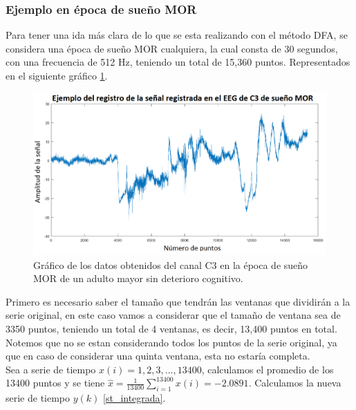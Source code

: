 \documentclass[letterpaper,titlepage,12pt]{report}
\begin{document}
\sloppy %

\subsubsection{Ejemplo en \'epoca de sue\~no MOR}

Para tener una ida m\'as clara de lo que se esta realizando con el m\'etodo DFA, se considera una \'epoca de sue\~no MOR cualquiera, la cual consta de 30 segundos, con una frecuencia de 512 Hz, teniendo un total de 15,360 puntos. Representados en el siguiente gr\'afico \ref{ejemplo}.  

\begin{figure}[H]
\begin{center}
\includegraphics[scale=0.3]{Ejemplo.png}
\caption{Gr\'afico de los datos obtenidos del canal C3 en la \'epoca de sue\~no MOR de un adulto mayor sin deterioro cognitivo.}
\label{ejemplo}
\end{center}
\end{figure}

Primero es necesario saber el tama\~no que tendr\'an las ventanas que dividir\'an a la serie original, en este caso vamos a considerar que el tama\~no de ventana sea de 3350 puntos, teniendo un total de 4 ventanas, es decir, 13,400 puntos en total. Notemos que no se estan considerando todos los puntos de la serie original, ya que en caso de considerar una quinta ventana, esta no estar\'ia completa.\\

Sea a serie de tiempo $x(i)=1,2,3,...,13400$, calculamos el promedio de los 13400 puntos y se tiene $\displaystyle \hat{x}=\frac{1}{13400} \sum_{i=1}^{13400} x(i)=-2.0891$. Calculamos la nueva serie de tiempo $y(k)$ \eqref{st_integrada}.\\
\end{document}
